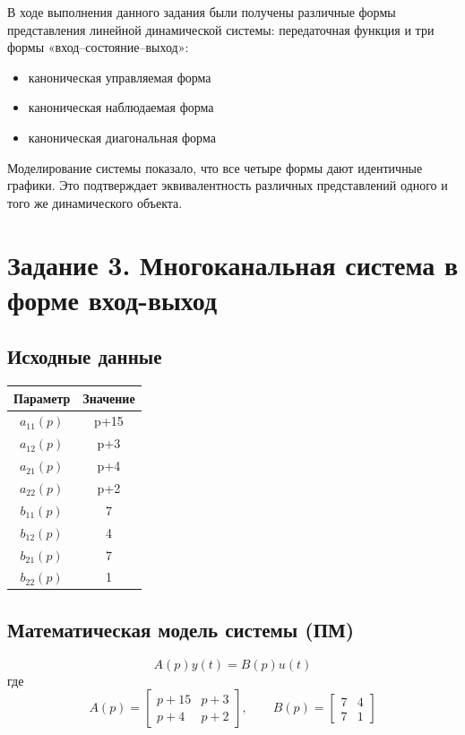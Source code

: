 \documentclass[a5paper, 10pt]{article}
\theoremstyle{definition}
\theoremstyle{plain}
\theoremstyle{remark}
\begin{document}
В ходе выполнения данного задания были получены различные формы представления линейной динамической системы: передаточная функция и три формы «вход–состояние–выход»:
\begin{itemize}
    \item каноническая управляемая форма
    \item каноническая наблюдаемая форма
    \item каноническая диагональная форма
\end{itemize}
Моделирование системы показало, что все четыре формы дают идентичные графики. Это подтверждает эквивалентность различных представлений одного и того же динамического объекта.

\section{Задание 3. Многоканальная система в форме вход-выход}

\subsection{Исходные данные}
\begin{center}
\begin{tabular}{|c|c|}
\hline
Параметр & Значение \\ \hline
$a_{11}(p)$ & p+15 \\ \hline
$a_{12}(p)$& p+3 \\ \hline
$a_{21}(p)$ & p+4 \\ \hline
$a_{22}(p)$ & p+2 \\ \hline
$b_{11}(p)$ & 7 \\ \hline
$b_{12}(p)$& 4 \\ \hline
$b_{21}(p)$ & 7 \\ \hline
$b_{22}(p)$ & 1 \\ \hline
\end{tabular}
\end{center}

\subsection{Математическая модель системы (ПМ)}

$$
A(p)y(t)=B(p)u(t)
$$
где 
$$
A(p)=\begin{bmatrix}
    p+15 &p+3\\
    p+4 &p+2
\end{bmatrix}, \qquad B(p)=\begin{bmatrix}
    7 &4\\
    7 &1
\end{bmatrix}
$$
\end{document}
